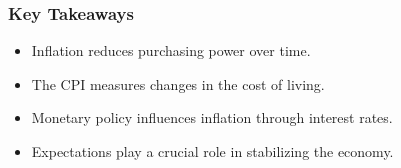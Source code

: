 \documentclass[aspectratio=169]{beamer}
\begin{document}
\begin{frame}
\transfade
\frametitle{Key Takeaways}
\begin{itemize}
\item Inflation reduces purchasing power over time.
\item The CPI measures changes in the cost of living.
\item Monetary policy influences inflation through interest rates.
\item Expectations play a crucial role in stabilizing the economy.
\end{itemize}
\end{frame}
\end{document}
